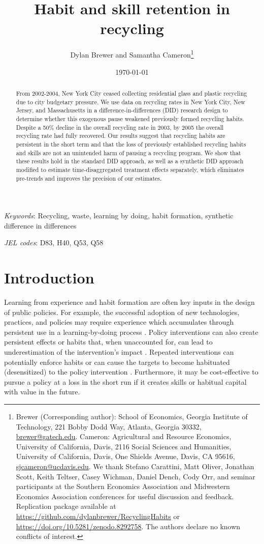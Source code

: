 \documentclass[12pt]{article}
\title{Habit and skill retention in recycling}
\author{Dylan Brewer and Samantha Cameron\thanks{Brewer (Corresponding author): School of Economics, Georgia Institute of Technology, 221 Bobby Dodd Way, Atlanta, Georgia 30332, \href{mailto:brewer@gatech.edu}{brewer@gatech.edu}.  Cameron: Agricultural and Resource Economics, University of California, Davis, 2116 Social Sciences and Humanities, University of California, Davis, One Shields Avenue, Davis, CA 95616, \href{mailto:sjcameron@ucdavis.edu}{sjcameron@ucdavis.edu}.  We thank Stefano Carattini, Matt Oliver, Jonathan Scott, Keith Teltser, Casey Wichman, Daniel Dench, Cody Orr, and seminar participants at the Southern Economics Association and Midwestern Economics Association conferences for useful discussion and feedback. Replication package available at \href{https://github.com/dylanbrewer/RecyclingHabits}{https://github.com/dylanbrewer/RecyclingHabits} or \href{https://doi.org/10.5281/zenodo.8292759}{https://doi.org/10.5281/zenodo.8292758}. The authors declare no known conflicts of interest.}}
\date{\today}
\begin{document}
\maketitle

\begin{abstract}
\begin{singlespace}
\noindent
From 2002-2004, New York City ceased collecting residential glass and plastic recycling due to city budgetary pressure.  We use data on recycling rates in New York City, New Jersey, and Massachusetts in a difference-in-differences (DID) research design to determine whether this exogenous pause weakened previously formed recycling habits.  Despite a 50\% decline in the overall recycling rate in 2003, by 2005 the overall recycling rate had fully recovered.  Our results suggest that recycling habits are persistent in the short term and that the loss of previously established recycling habits and skills are not an unintended harm of pausing a recycling program.  We show that these results hold in the standard DID approach, as well as a synthetic DID approach modified to estimate time-disaggregated treatment effects separately, which eliminates pre-trends and improves the precision of our estimates.
\end{singlespace}
\end{abstract}
\noindent \textit{Keywords}: Recycling, waste, learning by doing, habit formation, synthetic difference in differences

\noindent \textit{JEL codes}: D83, H40, Q53, Q58

\clearpage

\section{Introduction}

Learning from experience and habit formation are often key inputs in the design of public policies.  For example, the successful adoption of new technologies, practices, and policies may require experience which accumulates through persistent use in a learning-by-doing process \citep{fosterrosenzweig1995}.  Policy interventions can also create persistent effects or habits that, when unaccounted for, can lead to underestimation of the intervention's impact \citep{allcottrogers2014}.  Repeated interventions can potentially enforce habits or can cause the targets to become habituated (desensitized) to the policy intervention \citep{itoidatanaka2018}.  Furthermore, it may be cost-effective to pursue a policy at a loss in the short run if it creates skills or habitual capital with value in the future.
\end{document}
